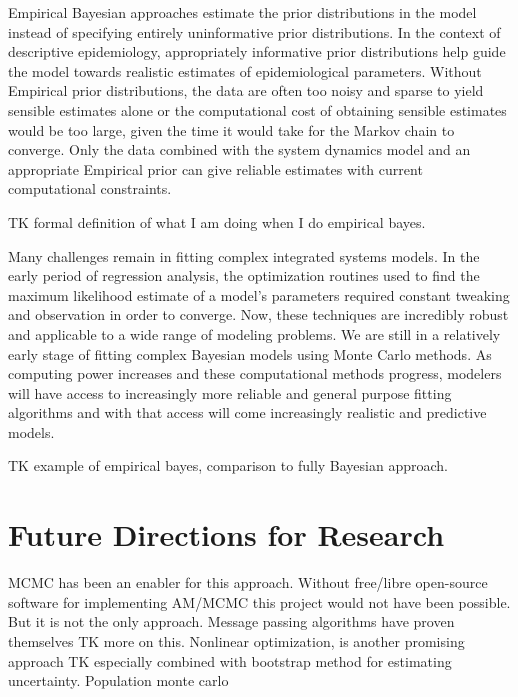 Empirical Bayesian approaches estimate the prior distributions in the
model instead of specifying entirely uninformative prior
distributions. In the context of descriptive epidemiology,
appropriately informative prior distributions help guide the model
towards realistic estimates of epidemiological parameters. Without
Empirical prior distributions, the data are often too noisy and sparse
to yield sensible estimates alone or the computational cost of
obtaining sensible estimates would be too large, given the time it
would take for the Markov chain to converge. Only the data combined
with the system dynamics model and an appropriate Empirical prior can
give reliable estimates with current computational constraints.

TK formal definition of what I am doing when I do empirical bayes.

Many challenges remain in fitting complex integrated systems
models. In the early period of regression analysis, the optimization
routines used to find the maximum likelihood estimate of a model's
parameters required constant tweaking and observation in order to
converge. Now, these techniques are incredibly robust and applicable
to a wide range of modeling problems. We are still in a relatively
early stage of fitting complex Bayesian models using Monte Carlo
methods. As computing power increases and these computational methods
progress, modelers will have access to increasingly more reliable and
general purpose fitting algorithms and with that access will come
increasingly realistic and predictive models.

TK example of empirical bayes, comparison to fully Bayesian approach.

\section{Future Directions for Research}

MCMC has been an enabler for this approach.  Without free/libre
open-source software for implementing AM/MCMC this project would not
have been possible.  But it is not the only approach.  Message passing
algorithms have proven themselves TK more on this.  Nonlinear
optimization, is another promising approach TK especially combined
with bootstrap method for estimating uncertainty.  Population monte
carlo
